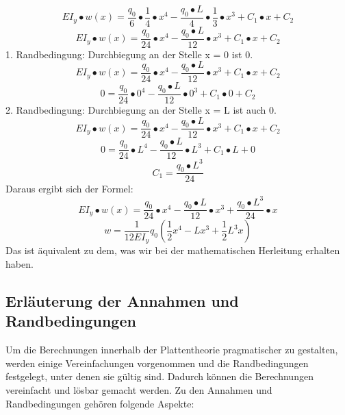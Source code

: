 \begin{equation}
	EI_y\bullet w\left(x\right)=
	\frac{q_0}{6}\bullet\frac{1}{4}\bullet x^4-\frac{q_0\bullet L}{4}\bullet\frac{1}{3}\bullet x^3+C_1\bullet x+C_2
\end{equation}
\begin{equation}
	EI_y\bullet w\left(x\right)=
	\frac{q_0}{24}\bullet x^4-\frac{q_0\bullet L}{12}\bullet x^3+C_1\bullet x+C_2
\end{equation}
1. Randbedingung: Durchbiegung an der Stelle x = 0 ist 0.
\begin{equation}
	EI_y\bullet w\left(x\right)=
	\frac{q_0}{24}\bullet x^4-\frac{q_0\bullet L}{12}\bullet x^3+C_1\bullet x+C_2
\end{equation}
\begin{equation}
	0=
	\frac{q_0}{24}\bullet0^4-\frac{q_0\bullet L}{12}\bullet0^3+C_1\bullet0+C_2
\end{equation}
2. Randbedingung: Durchbiegung an der Stelle x = L ist auch 0.
\begin{equation}
	EI_y\bullet w\left(x\right)=
	\frac{q_0}{24}\bullet x^4-\frac{q_0\bullet L}{12}\bullet x^3+C_1\bullet x+C_2
\end{equation}
\begin{equation}
	0=
	\frac{q_0}{24}\bullet L^4-\frac{q_0\bullet L}{12}\bullet L^3+C_1\bullet L+0
\end{equation}
\begin{equation}
	C_1=
	\frac{q_0\bullet L^3}{24}
\end{equation}
Daraus ergibt sich der Formel:
\begin{equation}
	EI_y\bullet w\left(x\right)=
	\frac{q_0}{24}\bullet x^4-\frac{q_0\bullet L}{12}\bullet x^3+\frac{q_0\bullet L^3}{24}\bullet x
\end{equation}
\begin{equation}
	w=
	\frac{1}{12EI_y}q_0\left(\frac{1}{2}x^4-Lx^3+\frac{1}{2}L^3x\right)
\end{equation}
Das ist äquivalent zu dem, was wir bei der mathematischen Herleitung erhalten haben.

\subsection{Erläuterung der Annahmen und Randbedingungen}
Um die Berechnungen innerhalb der Plattentheorie pragmatischer zu gestalten, werden einige Vereinfachungen vorgenommen und die Randbedingungen festgelegt, unter denen sie gültig sind.
Dadurch können die Berechnungen vereinfacht und lösbar gemacht werden.
Zu den Annahmen und Randbedingungen gehören folgende Aspekte:

